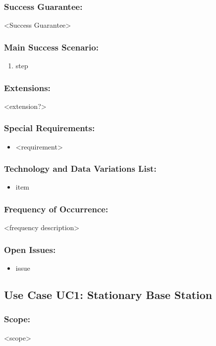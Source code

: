 \documentclass[ProductRequirements.tex]{subfiles}
\begin{document}
	\subsubsection*{Success Guarantee:}
	<Success Guarantee>
	\subsubsection*{Main Success Scenario:}
	\begin{enumerate}\itemsep1pt
		\item step
	\end{enumerate}
	\subsubsection*{Extensions:}
	<extension?>
	\subsubsection*{Special Requirements:}
	\begin{itemize}\itemsep1pt
		\item <requirement>
	\end{itemize}
	\subsubsection*{Technology and Data Variations List:}
	\begin{itemize}\itemsep1pt
		\item item
	\end{itemize}
	\subsubsection*{Frequency of Occurrence:}
	<frequency description>
	\subsubsection*{Open Issues:}
	\begin{itemize}\itemsep1pt
		\item issue
	\end{itemize}
	
	
	\subsection{Use Case UC1: Stationary Base Station}
	\subsubsection*{Scope:}
	<scope>
\end{document}
